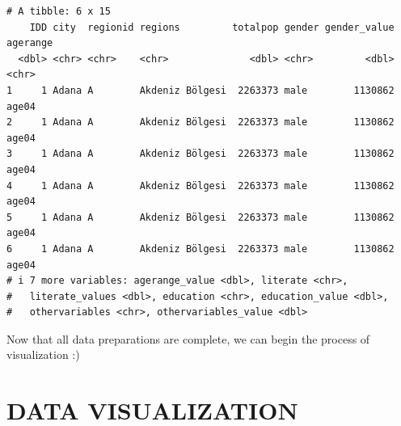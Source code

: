 \documentclass[
  11pt,
  a4paper,
  DIV=11,
  numbers=noendperiod]{scrartcl}
\newenvironment{Shaded}{\begin{snugshade}}{\end{snugshade}}
\newcommand{\AttributeTok}[1]{\textcolor[rgb]{0.40,0.45,0.13}{#1}}
\newcommand{\ControlFlowTok}[1]{\textcolor[rgb]{0.00,0.23,0.31}{#1}}
\newcommand{\DecValTok}[1]{\textcolor[rgb]{0.68,0.00,0.00}{#1}}
\newcommand{\FunctionTok}[1]{\textcolor[rgb]{0.28,0.35,0.67}{#1}}
\newcommand{\NormalTok}[1]{\textcolor[rgb]{0.00,0.23,0.31}{#1}}
\newcommand{\OtherTok}[1]{\textcolor[rgb]{0.00,0.23,0.31}{#1}}
\newcommand{\SpecialCharTok}[1]{\textcolor[rgb]{0.37,0.37,0.37}{#1}}
\newcommand{\StringTok}[1]{\textcolor[rgb]{0.13,0.47,0.30}{#1}}
\begin{document}
\begin{verbatim}
# A tibble: 6 x 15
    IDD city  regionid regions         totalpop gender gender_value agerange
  <dbl> <chr> <chr>    <chr>              <dbl> <chr>         <dbl> <chr>   
1     1 Adana A        Akdeniz Bölgesi  2263373 male        1130862 age04   
2     1 Adana A        Akdeniz Bölgesi  2263373 male        1130862 age04   
3     1 Adana A        Akdeniz Bölgesi  2263373 male        1130862 age04   
4     1 Adana A        Akdeniz Bölgesi  2263373 male        1130862 age04   
5     1 Adana A        Akdeniz Bölgesi  2263373 male        1130862 age04   
6     1 Adana A        Akdeniz Bölgesi  2263373 male        1130862 age04   
# i 7 more variables: agerange_value <dbl>, literate <chr>,
#   literate_values <dbl>, education <chr>, education_value <dbl>,
#   othervariables <chr>, othervariables_value <dbl>
\end{verbatim}

\begin{Shaded}
\end{Shaded}

Now that all data preparations are complete, we can begin the process of
visualization :)

\hypertarget{data-visualization}{%
\section{DATA VISUALIZATION}\label{data-visualization}}
\end{document}
